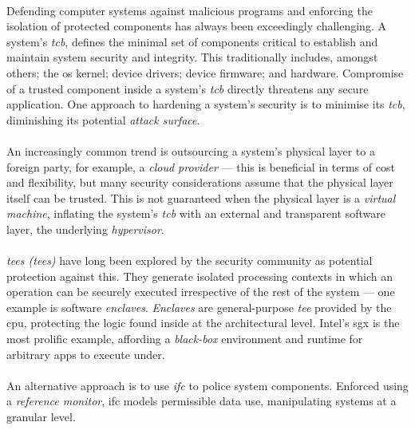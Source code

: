 


\paragraph{} Defending computer systems against malicious programs and enforcing the isolation of protected components has always been exceedingly challenging. A system's \textit{\acrfull{tcb}}, defines the minimal set of components critical to establish and maintain system security and integrity. This traditionally includes, amongst others; the \acrshort{os} kernel; device drivers; device firmware; and hardware. Compromise of a trusted component inside a system's \textit{\acrshort{tcb}} directly threatens any secure application. One approach to hardening a system's security is to minimise its \textit{\acrshort{tcb}}, diminishing its potential \textit{attack surface}. 

\paragraph{} An increasingly common trend is outsourcing a system's physical layer to a foreign party, for example, a \textit{cloud provider} --- this is beneficial in terms of cost and flexibility, but many security considerations assume that the physical layer itself can be trusted. This is not guaranteed when the physical layer is a \textit{virtual machine}, inflating the system's \textit{\acrshort{tcb}} with an external and transparent software layer, the underlying \textit{hypervisor}.

\paragraph{} \textit{\acrlong{tee}s (\acrshort{tee}s)} have long been explored by the security community as potential protection against this. They generate isolated processing contexts in which an operation can be securely executed irrespective of the rest of the system --- one example is software \textit{enclaves}. \textit{Enclaves} are general-purpose \textit{\acrshort{tee}} provided by the \acrshort{cpu}, protecting the logic found inside at the architectural level. Intel's \acrfull{sgx} is the most prolific example, affording a \textit{black-box} environment and runtime for arbitrary apps to execute under.

\paragraph{} An alternative approach is to use \textit{\acrfull{ifc}} to police system components. Enforced using a \textit{reference monitor}, \acrshort{ifc} models permissible data use, manipulating systems at a granular level.

